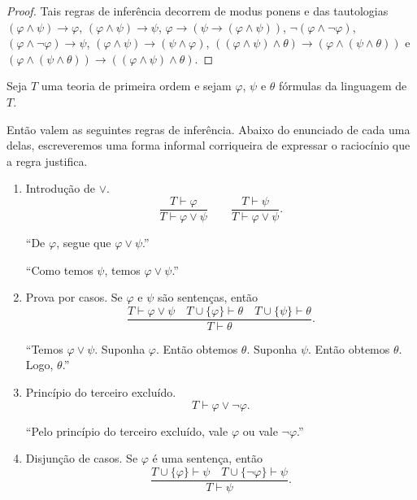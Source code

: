 \begin{proof}
    Tais regras de inferência decorrem de modus ponens e das tautologias $(\varphi\land \psi)\rightarrow\varphi$, $(\varphi\land \psi)\rightarrow\psi$, $\varphi\rightarrow(\psi\rightarrow(\varphi\land\psi))$, $\neg(\varphi\land\neg\varphi)$, $(\varphi\land\neg\varphi)\rightarrow\psi$, $(\varphi\land\psi)\rightarrow(\psi\land\varphi)$, $((\varphi\land\psi)\land\theta)\rightarrow(\varphi\land(\psi\land\theta))$ e $(\varphi\land(\psi\land\theta))\rightarrow((\varphi\land\psi)\land\theta)$.
\end{proof}

\begin{metaproposition}\label{mprop:regrasProposicionaisDisjuncao}
    Seja $T$ uma teoria de primeira ordem e sejam $\varphi$, $\psi$ e $\theta$ fórmulas da linguagem de $T$.

    Então valem as seguintes regras de inferência.
    Abaixo do enunciado de cada uma delas, escreveremos uma forma informal corriqueira de expressar o raciocínio que a regra justifica.
    \begin{enumerate}[label=(\roman*)]

        \item Introdução de $\lor$.
        \[
            \frac{T\vdash \varphi}
                 {T\vdash \varphi\lor\psi}
            \qquad
            \frac{T\vdash \psi}
                 {T\vdash \varphi\lor\psi}.
        \]

        ``De $\varphi$, segue que $\varphi\lor\psi$.''

        ``Como temos $\psi$, temos $\varphi\lor\psi$.''

        \item Prova por casos. Se $\varphi$ e $\psi$ são sentenças, então
        \[
            \frac{T\vdash \varphi\lor\psi \quad T\cup\{\varphi\}\vdash \theta \quad T\cup\{\psi\}\vdash \theta}
                 {T\vdash \theta}.
        \]

        ``Temos $\varphi\lor\psi$. Suponha $\varphi$. Então obtemos $\theta$. Suponha $\psi$. Então obtemos $\theta$. Logo, $\theta$.''

        \item Princípio do terceiro excluído.
        \[
            T\vdash \varphi\lor\neg\varphi.
        \]

        ``Pelo princípio do terceiro excluído, vale $\varphi$ ou vale $\neg\varphi$.''

        \item Disjunção de casos. Se $\varphi$ é uma sentença, então
        \[
            \frac{T\cup\{\varphi\}\vdash \psi \quad T\cup\{\neg\varphi\}\vdash \psi}
                 {T\vdash \psi}.
        \]


\end{enumerate}
\end{metaproposition}

